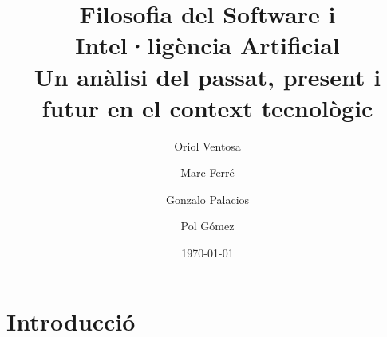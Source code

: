 \documentclass[a4paper,12pt]{report}
\begin{document}
\title{
	{\bf Filosofia del Software i Intel·ligència Artificial} \\ \vspace{2 mm}
	{\large Un anàlisi del passat, present i futur en el context tecnològic}
}
\author{
	Oriol Ventosa \and
	Marc Ferré \and
	Gonzalo Palacios \and
	Pol Gómez
}
\date{\today}
\maketitle

\tableofcontents

\chapter{Introducció}

\end{document}
